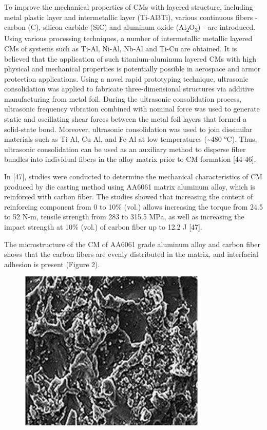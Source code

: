 To improve the mechanical properties of CMs with layered structure,
including metal plastic layer and intermetallic layer (Ti-Al3Ti),
various continuous fibers - carbon (C), silicon carbide (SiC) and
aluminum oxide (Al\textsubscript{2}O\textsubscript{3}) - are introduced.
Using various processing techniques, a number of intermetallic metallic
layered CMs of systems such as Ti-Al, Ni-Al, Nb-Al and Ti-Cu are
obtained. It is believed that the application of such titanium-aluminum
layered CMs with high physical and mechanical properties is potentially
possible in aerospace and armor protection applications. Using a novel
rapid prototyping technique, ultrasonic consolidation was applied to
fabricate three-dimensional structures via additive manufacturing from
metal foil. During the ultrasonic consolidation process, ultrasonic
frequency vibration combined with nominal force was used to generate
static and oscillating shear forces between the metal foil layers that
formed a solid-state bond. Moreover, ultrasonic consolidation was used
to join dissimilar materials such as Ti-Al, Cu-Al, and Fe-Al at low
temperatures (\textasciitilde480 °C). Thus, ultrasonic consolidation can
be used as an auxiliary method to disperse fiber bundles into individual
fibers in the alloy matrix prior to CM formation {[}44-46{]}.

In {[}47{]}, studies were conducted to determine the mechanical
characteristics of CM produced by die casting method using AA6061 matrix
aluminum alloy, which is reinforced with carbon fiber. The studies
showed that increasing the content of reinforcing component from 0 to
10\% (vol.) allows increasing the torque from 24.5 to 52 N-m, tensile
strength from 283 to 315.5 MPa, as well as increasing the impact
strength at 10\% (vol.) of carbon fiber up to 12.2 J {[}47{]}.

The microstructure of the CM of AA6061 grade aluminum alloy and carbon
fiber shows that the carbon fibers are evenly distributed in the matrix,
and interfacial adhesion is present (Figure 2).


\begin{figure}[H]
	\centering
	\includegraphics[width=0.8\textwidth]{media/chem/image8}
	\caption*{}
\end{figure}


